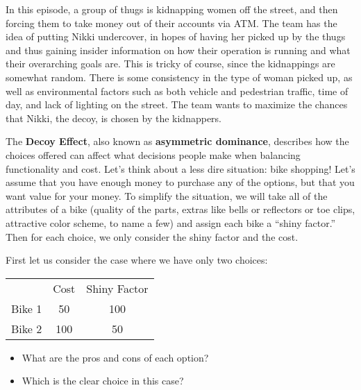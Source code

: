 \newpage
{}
{}
\setcounter{activity}{0}

In this episode, a group of thugs is kidnapping women off the street, and then forcing them to take money out of their accounts via ATM. The team has the idea of putting Nikki undercover, in hopes of having her picked up by the thugs and thus gaining insider information on how their operation is running and what their overarching goals are. This is tricky of course, since the kidnappings are somewhat random. There is some consistency in the type of woman picked up, as well as environmental factors such as both vehicle and pedestrian traffic, time of day, and lack of lighting on the street. The team wants to maximize the chances that Nikki, the decoy, is chosen by the kidnappers.


The \textbf{Decoy Effect}, also known as \textbf{asymmetric dominance}, describes how the choices offered can affect what decisions people make when balancing functionality and cost. Let’s think about a less dire situation: bike shopping! Let’s assume that you have enough money to purchase any of the options, but that you want value for your money. To simplify the situation, we will take all of the attributes of a bike (quality of the parts, extras like bells or reflectors or toe clips, attractive color scheme, to name a few) and assign each bike a ``shiny factor.'' Then for each choice, we only consider the shiny factor and the cost.


First let us consider the case where we have only two choices:


        \begin{table}[H]
        \centering
        \begin{tabular}{rcc}
        \multicolumn{1}{l}{} & Cost & Shiny Factor \\ \cline{2-3} 
        \multicolumn{1}{r|}{Bike 1} & \multicolumn{1}{c|}{50}  & \multicolumn{1}{c|}{100} \\ \cline{2-3} 
        \multicolumn{1}{r|}{Bike 2} & \multicolumn{1}{c|}{100} & \multicolumn{1}{c|}{50}  \\ \cline{2-3} 
        \end{tabular}
        \end{table}


\begin{itemize}
\item What are the pros and cons of each option?
\item Which is the clear choice in this case?
\end{itemize}


